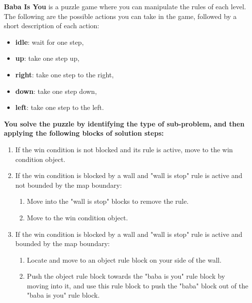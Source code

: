 \begin{GreenBox}
	[frametitle={\textbf{Iteration 2 Baba-is-ai Prompt}}]

	\textbf{Baba Is You} is a puzzle game where you can manipulate the rules of each
	level. The following are the possible actions you can take in the game, followed
	by a short description of each action:

	\begin{itemize}
		\item \textbf{idle}: wait for one step,

		\item \textbf{up}: take one step up,

		\item \textbf{right}: take one step to the right,

		\item \textbf{down}: take one step down,

		\item \textbf{left}: take one step to the left.
	\end{itemize}

	\textbf{You solve the puzzle by identifying the type of sub-problem, and then applying
	the following blocks of solution steps:}
	\begin{enumerate}
		\item If the win condition is not blocked and its rule is active, move to
			the win condition object.

		\item If the win condition is blocked by a wall and "wall is stop" rule is active
			and not bounded by the map boundary:
			\begin{enumerate}
				\item Move into the "wall is stop" blocks to remove the rule.

				\item Move to the win condition object.
			\end{enumerate}

		\item If the win condition is blocked by a wall and "wall is stop" rule is active
			and bounded by the map boundary:
			\begin{enumerate}
				\item Locate and move to an object rule block on your side of the wall.

				\item Push the object rule block towards the "baba is you" rule block by
					moving into it, and use this rule block to push the "baba" block out
					of the "baba is you" rule block.
			\end{enumerate}


\end{enumerate}
\end{GreenBox}
